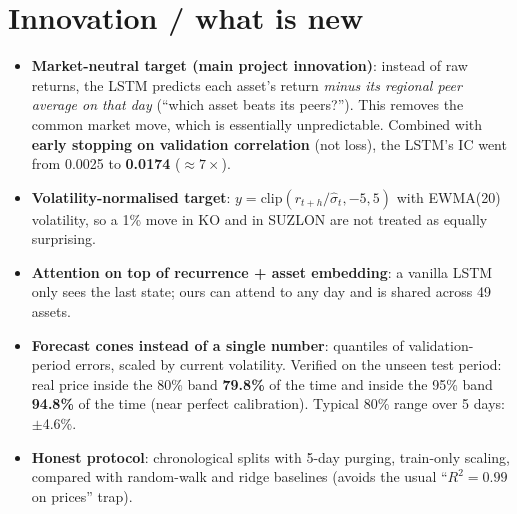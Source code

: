 \documentclass[10pt,a4paper]{article}
\begin{document}
\section{Innovation / what is new}
\begin{itemize}
  \item \textbf{Market-neutral target (main project innovation)}: instead of raw returns, the LSTM predicts each asset's return \emph{minus its regional peer average on that day} (``which asset beats its peers?''). This removes the common market move, which is essentially unpredictable. Combined with \textbf{early stopping on validation correlation} (not loss), the LSTM's IC went from 0.0025 to \textbf{0.0174} ($\approx 7\times$).
  \item \textbf{Volatility-normalised target}: $y=\mathrm{clip}(r_{t+h}/\hat\sigma_t,-5,5)$ with EWMA(20) volatility, so a 1\% move in KO and in SUZLON are not treated as equally surprising.
  \item \textbf{Attention on top of recurrence + asset embedding}: a vanilla LSTM only sees the last state; ours can attend to any day and is shared across 49 assets.
  \item \textbf{Forecast cones instead of a single number}: quantiles of validation-period errors, scaled by current volatility. Verified on the unseen test period: real price inside the 80\% band \textbf{79.8\%} of the time and inside the 95\% band \textbf{94.8\%} of the time (near perfect calibration). Typical 80\% range over 5 days: $\pm$4.6\%.
  \item \textbf{Honest protocol}: chronological splits with 5-day purging, train-only scaling, compared with random-walk and ridge baselines (avoids the usual ``$R^2=0.99$ on prices'' trap).
\end{itemize}
\end{document}
